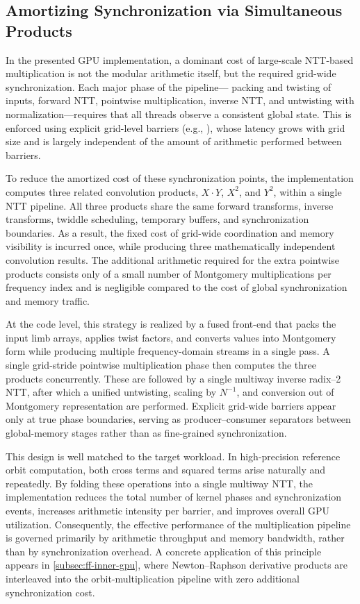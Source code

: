\subsection{Amortizing Synchronization via Simultaneous Products}
\label{subsec:amortize-sync}

In the presented GPU implementation, a dominant cost of large-scale NTT-based
multiplication is not the modular arithmetic itself, but the required grid-wide
synchronization. Each major phase of the pipeline— packing and twisting of
inputs, forward NTT, pointwise multiplication, inverse NTT, and untwisting with
normalization—requires that all threads observe a consistent global state. This
is enforced using explicit grid-level barriers (e.g.,
), whose latency grows with
grid size and is largely independent of the amount of arithmetic performed
between barriers.

To reduce the amortized cost of these synchronization points, the implementation
computes three related convolution products, $X\cdot Y$, $X^2$, and $Y^2$,
within a single NTT pipeline. All three products share the same forward
transforms, inverse transforms, twiddle scheduling, temporary buffers, and
synchronization boundaries. As a result, the fixed cost of grid-wide
coordination and memory visibility is incurred once, while producing three
mathematically independent convolution results. The additional arithmetic
required for the extra pointwise products consists only of a small number of
Montgomery multiplications per frequency index and is negligible compared to the
cost of global synchronization and memory traffic.

At the code level, this strategy is realized by a fused front-end that packs the
input limb arrays, applies twist factors, and converts values into Montgomery
form while producing multiple frequency-domain streams in a single pass. A
single grid-stride pointwise multiplication phase then computes the three
products concurrently. These are followed by a single multiway inverse radix--2
NTT, after which a unified untwisting, scaling by $N^{-1}$, and conversion out
of Montgomery representation are performed. Explicit grid-wide barriers appear
only at true phase boundaries, serving as producer--consumer separators between
global-memory stages rather than as fine-grained synchronization.

This design is well matched to the target workload. In high-precision reference
orbit computation, both cross terms and squared terms arise naturally and
repeatedly. By folding these operations into a single multiway NTT, the
implementation reduces the total number of kernel phases and synchronization
events, increases arithmetic intensity per barrier, and improves overall GPU
utilization. Consequently, the effective performance of the multiplication
pipeline is governed primarily by arithmetic throughput and memory bandwidth,
rather than by synchronization overhead.  A concrete application of this
principle appears in \cref{subsec:ff-inner-gpu}, where Newton--Raphson
derivative products are interleaved into the orbit-multiplication pipeline
with zero additional synchronization cost.


